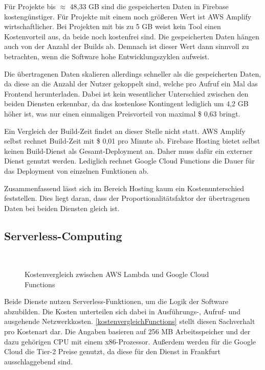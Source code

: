 Für Projekte bis $\approx$ 48,33 GB sind die gespeicherten Daten in Firebase kostengünstiger. Für Projekte mit einem noch größeren Wert ist \ac{AWS} Amplify wirtschaftlicher. Bei Projekten mit bis zu 5 GB weist kein Tool einen Kostenvorteil aus, da beide noch kostenfrei sind. Die gespeicherten Daten hängen auch von der Anzahl der Builds ab. Demnach ist dieser Wert dann sinnvoll zu betrachten, wenn die Software hohe Entwicklungszyklen aufweist.

Die übertragenen Daten skalieren allerdings schneller als die gespeicherten Daten, da diese an die Anzahl der Nutzer gekoppelt sind, welche pro Aufruf ein Mal das Frontend herunterladen. Dabei ist kein wesentlicher Unterschied zwischen den beiden Diensten erkennbar, da das kostenlose Kontingent lediglich um 4,2 GB höher ist, was nur einen einmaligen Preisvorteil von maximal \$ 0,63 bringt.

Ein Vergleich der Build-Zeit findet an dieser Stelle nicht statt. \ac{AWS} Amplify selbst rechnet Build-Zeit mit \$ 0,01 pro Minute ab. Firebase Hosting bietet selbst keinen Build-Dienst als Gesamt-Deployment an. Daher muss dafür ein externer Dienst genutzt werden. Lediglich rechnet Google Cloud Functions die Dauer für das Deployment von einzelnen Funktionen ab.

Zusammenfassend lässt sich im Bereich Hosting kaum ein Kostenunterschied feststellen. Dies liegt daran, dass der  Proportionalitätsfaktor der übertragenen Daten bei beiden Diensten gleich ist.

\subsection{Serverless-Computing}

\begin{figure}
  \centering
  \quad
  \\
  \quad
  \caption{Kostenvergleich zwischen AWS Lambda und Google Cloud Functions}
  \label{kostenvergleichFunctions}
\end{figure}

Beide Dienste nutzen Serverless-Funktionen, um die Logik der Software abzubilden. Die Kosten unterteilen sich dabei in Ausführungs-, Aufruf- und ausgehende Netzwerkkosten. \autoref{kostenvergleichFunctions} stellt diesen Sachverhalt pro Kostenart dar. Die Angaben basieren auf 256 MB Arbeitsspeicher und der dazu gehörigen CPU mit einem x86-Prozessor. Außerdem werden für die Google Cloud die Tier-2 Preise genutzt, da diese für den Dienst in Frankfurt ausschlaggebend sind.

